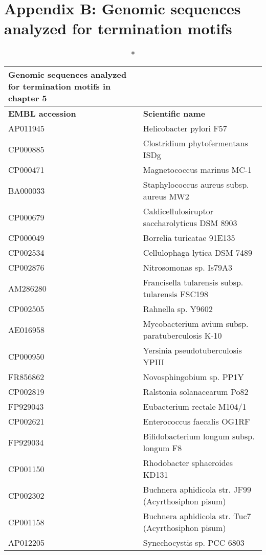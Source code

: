 \chapter{Appendix B: Genomic sequences analyzed for termination motifs}
\ifpdf
    \graphicspath{{AppendixB/AppendixBFigs/EPS/}{AppendixB/AppendixBFigs/}}
\fi

\begingroup
  \centering
     \tiny
   \noindent
  \begin{longtable}{ll}
  \caption*{Genomic sequences analyzed for termination motifs in chapter 5}   
  \\ 
    \toprule
    \textbf{EMBL accession} & \textbf{Scientific name} \\
    \midrule
AP011945 & Helicobacter pylori F57\\
CP000885 & Clostridium phytofermentans ISDg\\
CP000471 & Magnetococcus marinus MC-1\\
BA000033 & Staphylococcus aureus subsp. aureus MW2\\
CP000679 & Caldicellulosiruptor saccharolyticus DSM 8903\\
CP000049 & Borrelia turicatae 91E135\\
CP002534 & Cellulophaga lytica DSM 7489\\
CP002876 & Nitrosomonas sp. Is79A3\\
AM286280 & Francisella tularensis subsp. tularensis FSC198\\
CP002505 & Rahnella sp. Y9602\\
AE016958 & Mycobacterium avium subsp. paratuberculosis K-10\\
CP000950 & Yersinia pseudotuberculosis YPIII\\
FR856862 & Novosphingobium sp. PP1Y\\
CP002819 & Ralstonia solanacearum Po82\\
FP929043 & Eubacterium rectale M104/1\\
CP002621 & Enterococcus faecalis OG1RF\\
FP929034 & Bifidobacterium longum subsp. longum F8\\
CP001150 & Rhodobacter sphaeroides KD131\\
CP002302 & Buchnera aphidicola str. JF99 (Acyrthosiphon pisum)\\
CP001158 & Buchnera aphidicola str. Tuc7 (Acyrthosiphon pisum)\\
AP012205 & Synechocystis sp. PCC 6803\\

\end{longtable}
